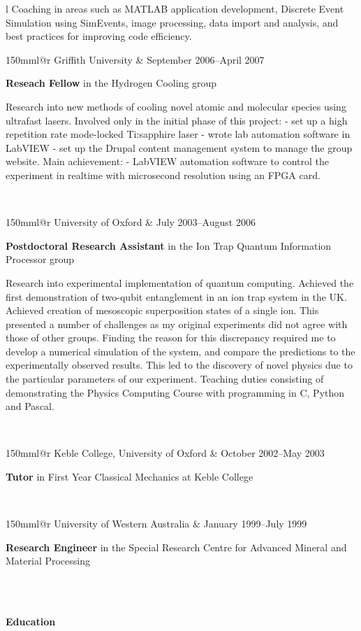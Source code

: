 \documentclass[10pt,a4paper]{article}
\makeatletter
\newcommand{\role}[6]{
\begin{tabular*}{150mm}{l@{\extracolsep{\fill}}r}
#5 & #1--#2 \\ 
\multicolumn{2}{p{140mm}}
{\textbf{#3}#4

#6} 
\end{tabular*}
\vspace{0.8mm}
 }
\makeatother
\begin{document}
\begin{tabular}{l}
{    Coaching in areas such as MATLAB application development, Discrete
    Event Simulation using SimEvents, image processing, data import and
    analysis, and best practices for improving code efficiency.} \\
  \role{September 2006}{April 2007}{Reseach Fellow}{ in the Hydrogen
  Cooling group}{Griffith University}
    {Research into new methods of cooling novel atomic and molecular species
    using ultrafast lasers. Involved only in the initial phase of this
    project: - set up a high repetition rate mode-locked Ti:sapphire laser
    - wrote lab automation software in LabVIEW - set up the Drupal content
    management system to manage the group website. Main achievement: -
    LabVIEW automation software to control the experiment in realtime with
    microsecond resolution using an FPGA card.}\\
  \role{July 2003}{August 2006}{Postdoctoral Research Assistant}{ in the
    Ion Trap Quantum Information Processor group}{University of Oxford}{
      Research into experimental implementation of quantum computing.
      Achieved the first demonstration of two-qubit entanglement in an ion
      trap system in the UK. Achieved creation of mesoscopic superposition
      states of a single ion. This presented a number of challenges as my
      original experiments did not agree with those of other groups.
      Finding the reason for this discrepancy required me to develop a
      numerical simulation of the system, and compare the predictions to
      the experimentally observed results. This led to the discovery of
      novel physics due to the particular parameters of our experiment.
      Teaching duties consisting of demonstrating the Physics Computing
      Course with programming in C, Python and Pascal.}\\
  \role{October 2002}{May 2003}{Tutor}{ in First Year Classical Mechanics at
  Keble College}{Keble College, University of Oxford}{}\\
  \role{January 1999}{July 1999}{Research Engineer}{ in the 
      Special Research Centre for Advanced Mineral and Material
      Processing}{University of Western Australia}{}\\
\end{tabular}
\\
\vspace{0.1in}
{\large \textbf{Education}}\\
\vspace{0.1in}
\end{document}
